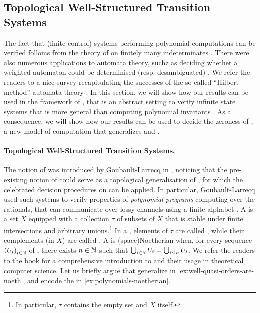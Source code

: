 \subsection{Topological Well-Structured Transition Systems}

The fact that (finite control) systems performing polynomial computations can
be verified folloms from the theory of  on finitely many
indeterminates \cite{MULSEI02,BEDUSHWO17}. There were also numerous
applications to automata theory, suchz as deciding whether a weighted automaton
could be determinised (resp. desambiguated) \cite{BESM23,PUSM24}. We refer the
readers to a nice survey recapitulating the successes of the so-called
``Hilbert method'' automata theory \cite{BOJAN19}. In this section, we will
show how our results can be used in the framework of , that is an abstract setting to verify
infinite state systems that is more general than computing polynomial
invariants \cite{JGL07,JGL10}. As a consequence, we will show how our results
can be used to decide the zeroness of , a
new model of computation that generalizes 
\cite{BEDUSHWO17} and  \cite{BOKLMO21}.

\paragraph{Topological Well-Structured Transition Systems.} \AP The notion of
 was introduced by
Goubault-Larrecq in \cite{JGL07}, noticing that the pre-existing notion of
 could serve as a topological generalisation of
, for which the celebrated decision procedures on
 can be applied. In particular,
Goubault-Larrecq used such systems to verify properties of \emph{polynomial
programs} computing over the rationals, that can communicate over lossy
channels using a finite alphabet \cite{JGL10}. 
\AP A  is a set $X$ equipped with a collection $\tau$
of subsets of $X$ that is stable under finite intersections and arbitrary
unions.\footnote{In particular, $\tau$ contains the empty set and $X$ itself.}
In a , elements of $\tau$ are called , while their complements (in $X$) are called . A
 is \intro(space){Noetherian} when, for every sequence
$\seqof{U_i}[i \in \N]$ of , there exists $n \in \mathbb{N}$ such that
$\bigcup_{i \in \mathbb{N}} U_i = \bigcup_{i \leq n} U_i$. We refer the readers to the
book \cite{JGL13} for a comprehensive introduction to 
and their usage in theoretical computer science. Let us briefly argue that
 generalize  in
\cref{ex:well-quasi-orders-are-noeth}, and encode the
 in \cref{ex:polynomials-noetherian}.

